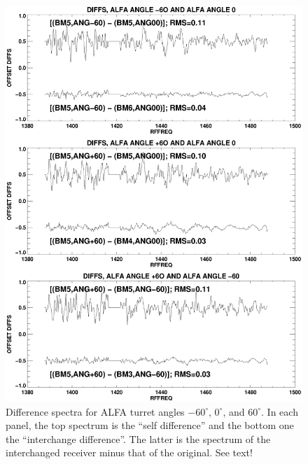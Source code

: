 \documentclass[psfig,preprint]{aastex}
\begin{document}
\begin{figure}[!p]
\begin{center}
\includegraphics[width=6in]{ccfplot.ps}   
\end{center}
\caption{Difference spectra for ALFA turret angles $-60^\circ$, $0^\circ$, and
$60^\circ$. In each panel, the top spectrum is the ``self difference''
and the bottom one the ``interchange difference''. The latter is the
spectrum of the interchanged receiver minus that of the original. See
text! \label{ccfplot}}
\end{figure}
\end{document}

